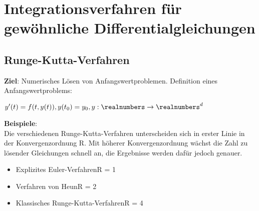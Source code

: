 \section{Integrationsverfahren für gewöhnliche Differentialgleichungen}%
\label{intd:sec:integrationsverfahren}
\subsection{Runge-Kutta-Verfahren}%
\label{intd:sub:runge-kutta}
\textbf{Ziel}: Numerisches Lösen von Anfangswertproblemen. Definition eines Anfangswertproblems:
\begin{center} 
	$y'(t) = f(t, y(t)), y(t_0) = y_0, y: \realnumbers \rightarrow \realnumbers^d$
\end{center}
\textbf{Beispiele}:\\
Die verschiedenen Runge-Kutta-Verfahren unterscheiden sich in erster Linie in der Konvergenzordnung R. Mit höherer Konvergenzordnung wächst die Zahl zu lösender Gleichungen schnell an, die Ergebnisse werden dafür jedoch genauer.
\begin{itemize}
	\item Explizites Euler-Verfahren\hfill R = 1
	\item Verfahren von Heun\hfill R = 2
	\item Klassisches Runge-Kutta-Verfahren\hfill R = 4
\end{itemize}